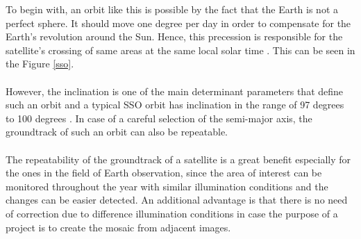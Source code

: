 \begin{itemize}
\begin{itemize}
	To begin with, an orbit like this is possible by the fact that the Earth is not a perfect sphere. It should move one degree per day in order to compensate for the Earth's revolution around the Sun. Hence, this precession is responsible for the satellite's crossing of same areas at the same local solar time \cite{Meseguer, Kramer 2002}. This can be seen in the Figure \ref{sso}.\\
	\\
	However, the inclination is one of the main determinant parameters that define such an orbit and a typical SSO orbit has inclination in the range of 97 degrees to 100 degrees \cite{Campbell}. In case of a careful selection of the semi-major axis, the groundtrack of such an orbit can also be repeatable.\\ %
	\\
	The repeatability of the groundtrack of a satellite is a great benefit especially for the ones in the field of Earth observation, since the area of interest can be monitored throughout the year with similar illumination conditions and the changes can be easier detected. An additional advantage is that there is no need of correction due to difference illumination conditions in case the purpose of a project is to create the mosaic from adjacent images. \\

\end{itemize}
\end{itemize}

